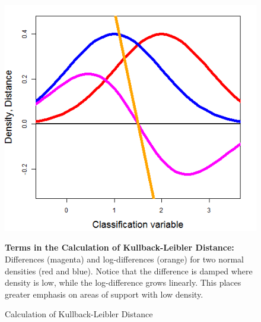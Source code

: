 


\begin{figure}[h!]

\begin{center}

    \caption{Calculation of Kullback-Leibler Distance} \label{fig:KLDdistance1}

        \includegraphics[scale=  0.50]{Figs/KLD/KLD_calc_3.png}



\end{center}

    \footnotesize

        \textbf{Terms in the Calculation of Kullback-Leibler Distance:}
        Differences (magenta) and log-differences (orange) for two normal densities (red and blue). 
        Notice that the difference is damped where density is low, while the log-difference grows linearly. 
        This places greater emphasis on areas of support with low density. 


\end{figure}



